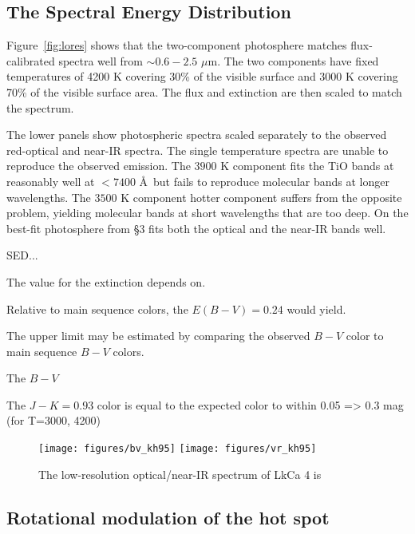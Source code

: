 \documentclass[twocolumn]{emulateapj}%
\begin{document}
\subsection{The Spectral Energy Distribution}

Figure~\ref{fig:lores} shows that the two-component photosphere matches flux-calibrated spectra well from $\sim 0.6-2.5$ $\mu$m.  The two components have fixed temperatures of 4200 K covering 30\% of the visible surface and 3000 K covering 70\% of the visible surface area.  The flux and extinction are then scaled to match the spectrum.

The lower panels show photospheric spectra scaled separately to the observed red-optical and near-IR spectra.  The single temperature spectra are unable to reproduce the observed emission.  The $3900$ K component fits the TiO bands at reasonably well at $<7400$ \AA\ but fails to reproduce molecular bands at longer wavelengths.  The $3500$ K component hotter component suffers from the opposite problem, yielding molecular bands at short wavelengths that are too deep.  On the best-fit photosphere from \S 3 fits both the optical and the near-IR bands well.

SED...

The value for the extinction depends on. 

Relative to main sequence colors, the $E(B-V)=0.24$ would yield.  






 The upper limit may be estimated by comparing the observed $B-V$ color to main sequence $B-V$ colors.

The $B-V$

The $J-K=0.93$ color is equal to the expected color to within 0.05 => 0.3 mag (for T=3000, 4200)

\begin{figure*}
	\centering
	\texttt{[image: figures/bv\_kh95]} 
    \texttt{[image: figures/vr\_kh95]} 
\caption{The low-resolution optical/near-IR spectrum of LkCa 4 is }
\vspace{-50mm}
\label{fig:colors}
\end{figure*}


\subsection{Rotational modulation of the hot spot}
\end{document}
